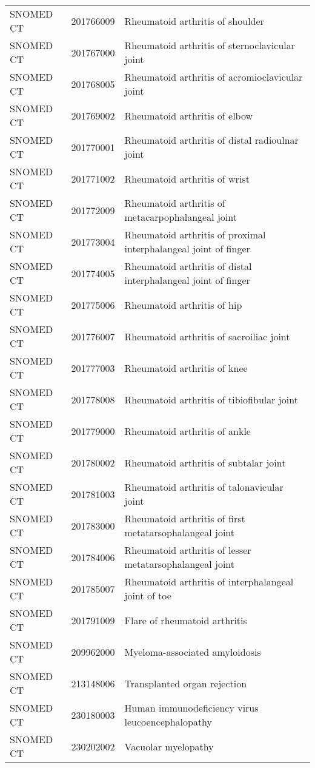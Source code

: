 \begin{table}[ht]
\begin{tabular}{lll}
  SNOMED CT & 201766009 & Rheumatoid arthritis of shoulder \\ 
  SNOMED CT & 201767000 & Rheumatoid arthritis of sternoclavicular joint \\ 
  SNOMED CT & 201768005 & Rheumatoid arthritis of acromioclavicular joint \\ 
  SNOMED CT & 201769002 & Rheumatoid arthritis of elbow \\ 
  SNOMED CT & 201770001 & Rheumatoid arthritis of distal radioulnar joint \\ 
  SNOMED CT & 201771002 & Rheumatoid arthritis of wrist \\ 
  SNOMED CT & 201772009 & Rheumatoid arthritis of metacarpophalangeal joint \\ 
  SNOMED CT & 201773004 & Rheumatoid arthritis of proximal interphalangeal joint of finger \\ 
  SNOMED CT & 201774005 & Rheumatoid arthritis of distal interphalangeal joint of finger \\ 
  SNOMED CT & 201775006 & Rheumatoid arthritis of hip \\ 
  SNOMED CT & 201776007 & Rheumatoid arthritis of sacroiliac joint \\ 
  SNOMED CT & 201777003 & Rheumatoid arthritis of knee \\ 
  SNOMED CT & 201778008 & Rheumatoid arthritis of tibiofibular joint \\ 
  SNOMED CT & 201779000 & Rheumatoid arthritis of ankle \\ 
  SNOMED CT & 201780002 & Rheumatoid arthritis of subtalar joint \\ 
  SNOMED CT & 201781003 & Rheumatoid arthritis of talonavicular joint \\ 
  SNOMED CT & 201783000 & Rheumatoid arthritis of first metatarsophalangeal joint \\ 
  SNOMED CT & 201784006 & Rheumatoid arthritis of lesser metatarsophalangeal joint \\ 
  SNOMED CT & 201785007 & Rheumatoid arthritis of interphalangeal joint of toe \\ 
  SNOMED CT & 201791009 & Flare of rheumatoid arthritis \\ 
  SNOMED CT & 209962000 & Myeloma-associated amyloidosis \\ 
  SNOMED CT & 213148006 & Transplanted organ rejection \\ 
  SNOMED CT & 230180003 & Human immunodeficiency virus leucoencephalopathy \\ 
  SNOMED CT & 230202002 & Vacuolar myelopathy \\ 

\end{tabular}
\end{table}
